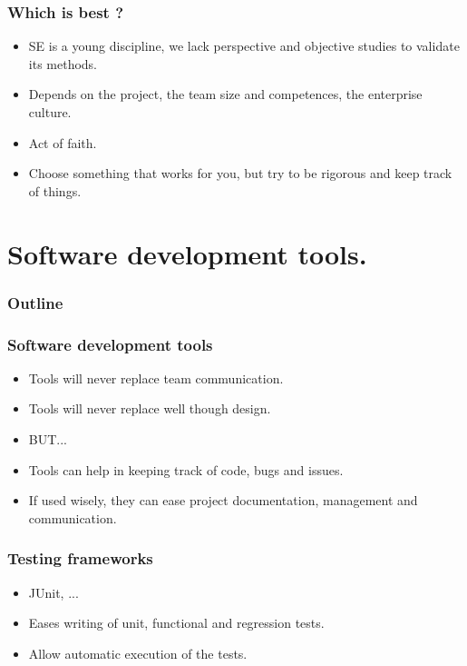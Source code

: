 \documentclass[10pt, handout]{beamer}
\begin{document}
\begin{frame}[fragile]
  \frametitle{Which is best ?}
  \begin{itemize}
    \item SE is a young discipline, we lack perspective and objective studies to
      validate its methods.
    \item Depends on the project, the team size and competences, the enterprise
      culture.
    \item Act of faith.
    \item Choose something that works for you, but try to be rigorous and keep
      track of things.
  \end{itemize}
\end{frame}

\section{Software development tools.}

\begin{frame}
  \frametitle{Outline}
  \tableofcontents[currentsection]
\end{frame}

\begin{frame}[fragile]
  \frametitle{Software development tools}
  \begin{itemize}
  \item Tools will never replace team communication.
  \item Tools will never replace well though design.
  \item BUT...
  \item Tools can help in keeping track of code, bugs and issues.
  \item If used wisely, they can ease project documentation,
    management and communication.
  \end{itemize}
\end{frame}
\begin{frame}[fragile]
  \frametitle{Testing frameworks}
  \begin{itemize}
  \item JUnit, ...
  \item Eases writing of unit, functional and regression tests.
  \item Allow automatic execution of the tests.
  \end{itemize}
\end{frame}
\end{document}
